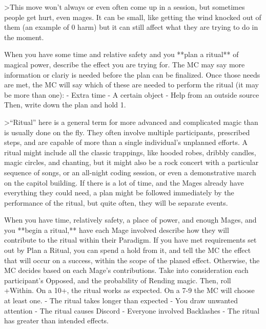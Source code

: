 \documentclass[
  oneside,
  statementpaper,
  9pt]{memoir}
\begin{document}
\begin{Player}
>This move won’t always or even often come up in a session, but sometimes people get hurt, even mages. It can be small, like getting the wind knocked out of them (an example of 0 harm) but it can still affect what they are trying to do in the moment. 

When you have some time and relative safety and you **plan a ritual** of magical power, describe the effect you are trying for. The MC may say more information or clariy is needed before the plan can be finalized. Once those needs are met, the MC will say which of these are needed to perform the ritual (it may be more than one):
- Extra time
- A certain object
- Help from an outside source 
Then, write down the plan and hold 1.

>“Ritual” here is a general term for more advanced and complicated magic than is usually done on the fly. They often involve multiple participants, prescribed steps, and are capable of more than a single individual’s unplanned efforts. A ritual might include all the classic trappings, like hooded robes, dribbly candles, magic circles, and chanting, but it might also be a rock concert with a particular sequence of songs, or an all-night coding session, or even a demonstrative march on the capitol building. If there is a lot of time, and the Mages already have everything they could need, a plan might be followed immediately by the performance of the ritual, but quite often, they will be separate events.

When you have time, relatively safety, a place of power, and enough Mages, and you **begin a ritual,** have each Mage involved describe how they will contribute to the ritual within their Paradigm. If you have met requirements set out by Plan a Ritual, you can spend a hold from it, and tell the MC the effect that will occur on a success, within the scope of the planed effect. Otherwise, the MC decides based on each Mage’s contributions. Take into consideration each participant’s Opposed, and the probability of Rending magic. Then, roll +Within. On a 10+, the ritual works as expected. On a 7-9 the MC will choose at least one.
- The ritual takes longer than expected
- You draw unwanted attention
- The ritual causes Discord
- Everyone involved Backlashes
- The ritual has greater than intended effects.


\end{Player}
\end{document}

